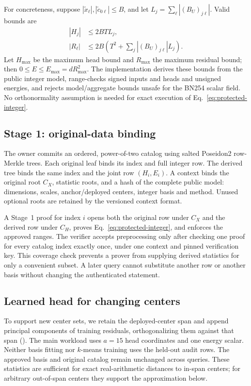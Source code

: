 \documentclass[5p,times,twocolumn]{elsarticle}
\theoremstyle{plain}
\theoremstyle{definition}
\theoremstyle{remark}
\begin{document}
\par\endgroup
\begingroup\color{RevisionGreen}
For concreteness, suppose $|\widetilde x_\ell|,|\widetilde c_{0\ell}|\le B$, and let $L_j=\sum_\ell |(B_U)_{j\ell}|$. Valid bounds are
\begin{align}
|H_j|&\le 2BTL_j,\nonumber\\
|R_\ell|&\le 2B\left(T^2+\sum_j|(B_U)_{j\ell}|L_j\right).\label{eq:row-bounds}
\end{align}
Let $H_{\max}$ be the maximum head bound and $R_{\max}$ the maximum residual bound; then $0\le E\le E_{\max}=dR_{\max}^2$. The implementation derives these bounds from the public integer model, range-checks signed inputs and heads and unsigned energies, and rejects model/aggregate bounds unsafe for the BN254 scalar field. No orthonormality assumption is needed for exact execution of Eq.~\eqref{eq:protected-integer}.


\par\endgroup
\subsection{\textcolor{RevisionGreen}{Stage 1: original-data binding}}\label{sec:query-relation}
\begingroup\color{RevisionGreen}
The owner commits an ordered, power-of-two catalog using salted Poseidon2 row-Merkle trees. Each original leaf binds its index and full integer row. The derived tree binds the same index and the joint row $(H_i,E_i)$. A context binds the original root $C_X$, statistic roots, and a hash of the complete public model: dimensions, scales, anchor/deployed centers, integer basis and method. Unused optional roots are retained by the versioned context format.


\par\endgroup
\begingroup\color{RevisionGreen}
A Stage~1 proof for index $i$ opens both the original row under $C_X$ and the derived row under $C_H$, proves Eq.~\eqref{eq:protected-integer}, and enforces the approved ranges. The verifier accepts preprocessing only after checking one proof for every catalog index exactly once, under one context and pinned verification key. This coverage check prevents a prover from supplying derived statistics for only a convenient subset. A later query cannot substitute another row or another basis without changing the authenticated statement.


\par\endgroup
\subsection{\textcolor{RevisionGreen}{Learned head for changing centers}}\label{sec:reuse}
\begingroup\color{RevisionGreen}
To support new center sets, we retain the deployed-center span and append principal components of training residuals, orthogonalizing them against that span (). The main workload uses $a=15$ head coordinates and one energy scalar. Neither basis fitting nor $k$-means training uses the held-out audit rows. The approved basis and original catalog remain unchanged across queries. These statistics are sufficient for exact real-arithmetic distances to in-span centers; for arbitrary out-of-span centers they support the approximation below.
\end{document}

